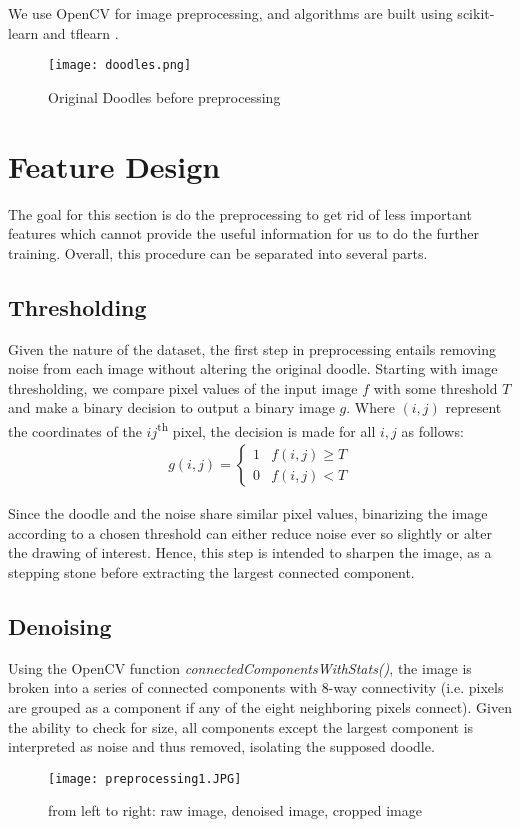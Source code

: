 \documentclass[conference]{IEEEtran}
\begin{document}
We use OpenCV \cite{opencv_library} for image preprocessing, and algorithms are built using scikit-learn \cite{scikit-learn} and tflearn \cite{tflearn2016}.
\begin{figure}[!htbp]
\centering
\texttt{[image: doodles.png]}
\caption{Original Doodles before preprocessing}
\end{figure}

\section{Feature Design}
The goal for this section is do the preprocessing to get rid of less important features which cannot provide the useful information for us to do the further training. Overall, this procedure can be separated into several parts.

\subsection{Thresholding}
Given the nature of the dataset, the first step in preprocessing entails removing noise from each image without altering the original doodle. Starting with image thresholding, we compare pixel values of the input image $f$ with some threshold $T$ and make a binary decision to output a binary image $g$. Where $(i, j)$ represent the coordinates of the $ij$\textsuperscript{th} pixel, the decision is made for all $i, j$ as follows: 
\begin{align}
g(i,j) = \begin{cases}
1 & f(i,j)\ge T\\
0 & f(i,j)< T
\end{cases}
\end{align}

Since the doodle and the noise share similar pixel values, binarizing the image according to a chosen threshold can either reduce noise ever so slightly or alter the drawing of interest. Hence, this step is intended to sharpen the image, as a stepping stone before extracting the largest connected component.

\subsection{Denoising}
Using the OpenCV function \textit{connectedComponentsWithStats()}, the image is broken into a series of connected components with 8-way connectivity (i.e. pixels are grouped as a component if any of the eight neighboring pixels connect). Given the ability to check for size, all components except the largest component is interpreted as noise and thus removed, isolating the supposed doodle. 
\begin{figure}[!htbp]
\centering
\texttt{[image: preprocessing1.JPG]}
\caption{from left to right: raw image, denoised image, cropped image}
\end{figure}
\end{document}
